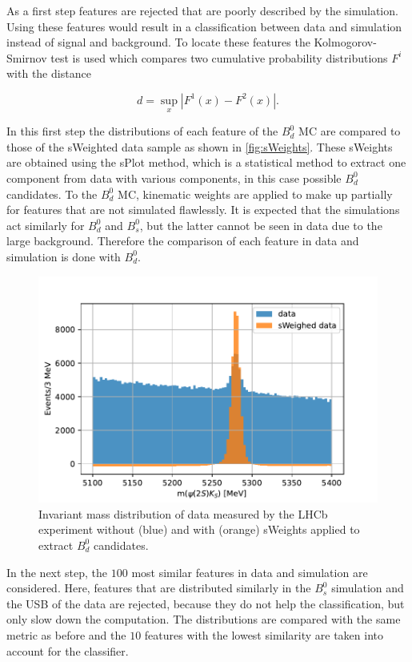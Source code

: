 As a first step features are rejected that are poorly described by the simulation. Using these features would result in a classification between data and simulation instead of signal and background. To locate these features the Kolmogorov-Smirnov test is used which compares two cumulative probability distributions $F^i$ with the distance

\begin{equation*}
  d = \sup_x \left|F^1(x) - F^2(x)\right|.
\end{equation*}

In this first step the distributions of each feature of the $B^0_d$ MC are compared to those of the sWeighted data sample as shown in \autoref{fig:sWeights}. These sWeights are obtained using the sPlot method, which is a statistical method to extract one component from data with various components, in this case possible $B^0_d$ candidates. To the $B^0_d$ MC, kinematic weights are applied to make up partially for features that are not simulated flawlessly. It is expected that the simulations act similarly for $B^0_d$ and $B^0_s$, but the latter cannot be seen in data due to the large background. Therefore the comparison of each feature in data and simulation is done with $B^0_d$.

\begin{figure}[H]
  \centering
  \includegraphics[width=12cm]{plots/sweights.pdf}
  \caption{Invariant mass distribution of data measured by the LHCb experiment without (blue) and with (orange) sWeights applied to extract $B^0_d$ candidates.}
  \label{fig:sWeights}
\end{figure}

In the next step, the $\num{100}$ most similar features in data and simulation are considered. Here, features that are distributed similarly in the $B^0_s$ simulation and the USB of the data are rejected, because they do not help the classification, but only slow down the computation. The distributions are compared with the same metric as before and the $\num{10}$ features with the lowest similarity are taken into account for the classifier.

